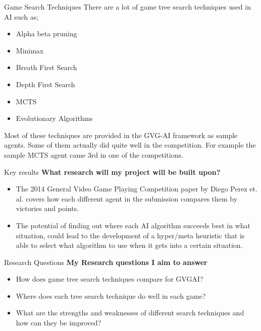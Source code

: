 \documentclass{beamer}
\begin{document}
\begin{frame}{Game Search Techniques}
		There are a lot of game tree search techniques used in AI such as; 
			\begin{itemize}
			\item Alpha beta pruning \pause
			\item Minimax \pause
			\item Breath First Search \pause
			\item Depth First Search \pause
			\item MCTS \pause
			\item Evolutionary Algorithms \pause
		\end{itemize}
		Most of these techniques are provided in the GVG-AI framework as sample agents. Some of them actually did quite well in the competition. \pause
		For example the sample MCTS agent came 3rd in one of the competitions. 
\end{frame}


\begin{frame}{Key results}
	\textbf{What research will my project will be built upon?}
	\begin{itemize}
		\item	The 2014 General Video Game Playing Competition paper by Diego Perez et. al. covers how each different agent in the submission compares them by victories and points. \pause
		
		\item	The potential of finding out where each AI algorithm succeeds best in what situation, could lead to the development of a hyper/meta heuristic that is able to select what algorithm to use when it gets into a certain situation.
		\end{itemize}
\end{frame}


\begin{frame}{Research Questions}
	\textbf{My Research questions I aim to answer}
	\begin{itemize}
    \item How does game tree search techniques compare for GVGAI?
    \item Where does each tree search technique do well in each game?
    \item What are the strengths and weaknesses of different search techniques and how can they be improved?
	\end{itemize}
\end{frame}
\end{document}
